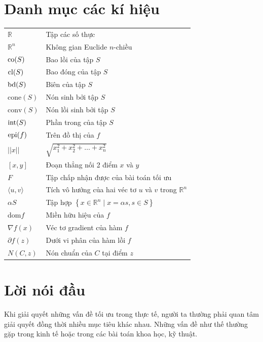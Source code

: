 \documentclass[12pt,a4paper]{report}
\begin{document}
	\newpage
	
	\tableofcontents
	\chapter*{Danh mục các kí hiệu}
	\thispagestyle{fancy}
	\begin{longtable}{l l}
		
		$\mathbb{R}$ & Tập các số thực\\
		$\mathbb{R}^n$ & Không gian Euclide $n$-chiều\\
		${\rm co}(S)$ & Bao lồi của tập $S$\\
		${\rm cl}(S)$ & Bao đóng của tập $S$\\
		${\rm bd}(S)$ & Biên của tập $S$\\
		$\mathrm{cone}(S)$ & Nón sinh bởi tập $S$\\
		$\mathrm{conv}(S)$ & Nón lồi sinh bởi tập $S$\\
		${\rm int}(S)$ & Phần trong của tập $S$\\
		${\rm epi}(f)$ & Trên đồ thị của $f$\\
		$|| x ||$ & $\sqrt {x_1^2 + x_2^2 + \ldots + x_n^2 }$		\\
		$[x,y]$ & Đoạn thẳng nối 2 điểm $x$ và $y$\\
		$F$ & Tập chấp nhận được của bài toán tối ưu\\
		$\langle u, v \rangle$ & Tích vô hướng của hai véc tơ $u$ và $v$ trong $\mathbb{R}^n$\\
		$\alpha S$ & Tập hợp $	\left\{ {x \in \mathbb{R}^n \mid x = \alpha s,s \in S} \right\}$\\
		dom$f$ & Miền hữu hiệu của $f$\\
		$\nabla f\left( x \right)$ & Véc tơ gradient của hàm $f$\\
		$\partial f(z)$ & Dưới vi phân của hàm lồi $f$\\
		$N(C,z)$ & Nón chuẩn của $C$ tại điểm $z$
		
	\end{longtable}
\newpage
{} 
\chapter*{Lời nói đầu}
\thispagestyle{fancy}
\renewcommand{\baselinestretch}{1.2}
Khi giải quyết những vấn đề tối ưu trong thực tế, người ta thường phải quan tâm giải quyết đồng thời nhiều mục tiêu khác nhau. Những vấn đề như thế thường gặp trong kinh tế hoặc trong các bài toán khoa học, kỹ thuật.
\end{document}
